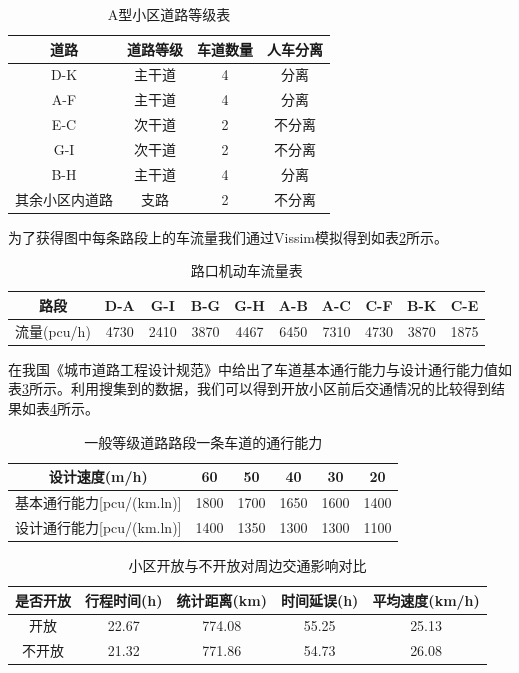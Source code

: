 \documentclass[fontset=windows,a4paper,12pt]{ctexart}
\begin{document}
		\begin{table}[!htbp]
			\centering
			\caption{A型小区道路等级表}
			\label{tab:road_level_a}
			\begin{tabular}{c|ccc}
				\toprule[1pt] 
				道路&				道路等级&	车道数量&人车分离\\
				\hline
				D-K&				主干道&	4&		分离\\
				A-F&				主干道&	4&		分离\\
				E-C&				次干道&	2&		不分离\\
				G-I&				次干道&	2&		不分离\\
				B-H&				主干道&	4&		分离\\
				其余小区内道路	&		支路&		2&		不分离\\
				\bottomrule[1pt]
			\end{tabular} 
		\end{table}
		为了获得图中每条路段上的车流量我们通过Vissim模拟得到如表\ref{tab:car_flow_a}所示。
		\begin{table}[!htbp]
			\centering
			\caption{路口机动车流量表}
			\label{tab:car_flow_a}
			\begin{tabular}{c|ccccccccc}
				\toprule[1pt] 
				路段&	D-A&	G-I&	B-G&	G-H&	A-B&	A-C&	C-F&	B-K&	C-E\\
				\hline
				流量(pcu/h)&	4730&	2410&	3870&	4467&	6450&	7310&	4730&	3870&	1875\\
				\bottomrule[1pt]
			\end{tabular} 
		\end{table}
		在我国《城市道路工程设计规范》中给出了车道基本通行能力与设计通行能力值如表\ref{tab:road_flow}所示。利用搜集到的数据，我们可以得到开放小区前后交通情况的比较得到结果如表\ref{tab:cmp_each}所示。
		\begin{table}[!htbp]
			\centering
			\caption{一般等级道路路段一条车道的通行能力}
			\label{tab:road_flow}
			\begin{tabular}{c|ccccc}
				\toprule[1pt] 
				设计速度(m/h)&	60&	50&	40&	30&	20\\
				\hline
				基本通行能力[pcu/(km.ln)]& 1800& 1700& 1650& 1600& 1400\\
				设计通行能力[pcu/(km.ln)]& 1400& 1350& 1300& 1300& 1100\\
				\bottomrule[1pt]
			\end{tabular} 
		\end{table}	
		\begin{table}[!htbp]
			\centering
			\caption{小区开放与不开放对周边交通影响对比}
			\label{tab:cmp_each}
			\begin{tabular}{c|cccc}
				\toprule[1pt] 
				是否开放&	行程时间(h)&	统计距离(km)&	时间延误(h)&	平均速度(km/h)\\
				\hline
				开放& 22.67& 774.08& 55.25& 25.13\\
				不开放& 21.32& 771.86& 54.73& 26.08\\
				\bottomrule[1pt]
			\end{tabular} 
		\end{table}		
		
\end{document}
